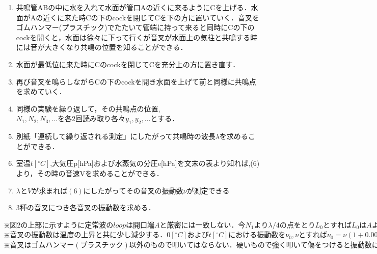 \documentclass[a4paper,1pt]{jsarticle}
\begin{document}
\begin{enumerate}
  \item 共鳴管ABの中に水を入れて水面が管口Aの近くに来るようにCを上げる．水面がAの近くに来た時Cの下のcockを閉じてCを下の方に置いていく．音叉をゴムハンマー(プラスチック)でたたいて管端に持って来ると同時にCの下のcockを開くと，水面は徐々に下って行くが音叉が水面上の気柱と共鳴する時には音が大きくなり共鳴の位置を知ることができる．
  \item 水面が最低位に来た時にCのcockを閉じてCを充分上の方に置き直す．
  \item 再び音叉を鳴らしながらCの下のcockを開き水面を上げて前と同様に共鳴点を求めていく．
  \item 同様の実験を繰り返して，その共鳴点の位置,$N_1,N_2,N_3,\dots を各2回読み取り各々y_1,y_2,\dots とする．$
  \item 別紙「連続して繰り返される測定」にしたがって共鳴時の波長$\lambda $を求めることができる．
  \item $室温t[{}^\circ{C}]$,大気圧p[hPa]および水蒸気の分圧e[hPa]を文末の表より知れば,(6)より，その時の音速Vを求めることができる．
  \item $\lambda とVが求まれば(6)にしたがってその音叉の振動数\nu が測定できる$
  \item 3種の音叉につき各音叉の振動数を求める．
\end{enumerate}

$\divideontimes 図2の上部に示すように定常波のloopは開口端Aと厳密には一致しない．今N_1より\lambda /4の点をとりL_0とすればL_0はAよりXだけ外になる．すなわちX=(\lambda /4)-AN_1であってXと管の半径rとの比を口端補正(terminal correction)と呼びこれを実験的に定めればX/r=0.55〜0.85となる．$\\

$\divideontimes 音叉の振動数は温度の上昇と共に少し減少する．0[{}^\circ{C}]およびt[{}^\circ{C}]における振動数を\nu _0,\nu とすれば\nu _0=\nu (1+0.000112t) によって求めた振動数を0[{}^\circ{C}]の振動数に書き直すこともできる．$\\

$\divideontimes 音叉はゴムハンマー(プラスチック)以外のもので叩いてはならない．硬いもので強く叩いて傷をつけると振動数に変化を生ずるし，強く叩いたことにより多くの倍音を生じて正しい音叉の基本音と混乱を生ずる．$



\clearpage
\end{document}
